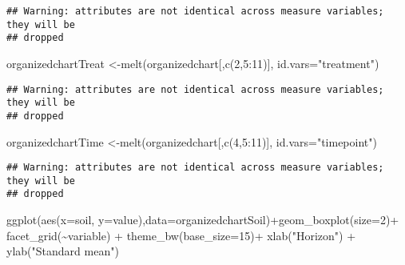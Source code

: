 \documentclass[
]{article}
\newenvironment{Shaded}{\begin{snugshade}}{\end{snugshade}}
\newcommand{\AttributeTok}[1]{\textcolor[rgb]{0.77,0.63,0.00}{#1}}
\newcommand{\DecValTok}[1]{\textcolor[rgb]{0.00,0.00,0.81}{#1}}
\newcommand{\FunctionTok}[1]{\textcolor[rgb]{0.00,0.00,0.00}{#1}}
\newcommand{\NormalTok}[1]{#1}
\newcommand{\OtherTok}[1]{\textcolor[rgb]{0.56,0.35,0.01}{#1}}
\newcommand{\SpecialCharTok}[1]{\textcolor[rgb]{0.00,0.00,0.00}{#1}}
\newcommand{\StringTok}[1]{\textcolor[rgb]{0.31,0.60,0.02}{#1}}
\begin{document}
\begin{verbatim}
## Warning: attributes are not identical across measure variables; they will be
## dropped
\end{verbatim}

\begin{Shaded}
\begin{Highlighting}[]
\NormalTok{organizedchartTreat }\OtherTok{\textless{}{-}}\FunctionTok{melt}\NormalTok{(organizedchart[,}\FunctionTok{c}\NormalTok{(}\DecValTok{2}\NormalTok{,}\DecValTok{5}\SpecialCharTok{:}\DecValTok{11}\NormalTok{)], }\AttributeTok{id.vars=}\StringTok{"treatment"}\NormalTok{)}
\end{Highlighting}
\end{Shaded}

\begin{verbatim}
## Warning: attributes are not identical across measure variables; they will be
## dropped
\end{verbatim}

\begin{Shaded}
\begin{Highlighting}[]
\NormalTok{organizedchartTime }\OtherTok{\textless{}{-}}\FunctionTok{melt}\NormalTok{(organizedchart[,}\FunctionTok{c}\NormalTok{(}\DecValTok{4}\NormalTok{,}\DecValTok{5}\SpecialCharTok{:}\DecValTok{11}\NormalTok{)], }\AttributeTok{id.vars=}\StringTok{"timepoint"}\NormalTok{)}
\end{Highlighting}
\end{Shaded}

\begin{verbatim}
## Warning: attributes are not identical across measure variables; they will be
## dropped
\end{verbatim}

\begin{Shaded}
\begin{Highlighting}[]
\FunctionTok{ggplot}\NormalTok{(}\FunctionTok{aes}\NormalTok{(}\AttributeTok{x=}\NormalTok{soil, }\AttributeTok{y=}\NormalTok{value),}\AttributeTok{data=}\NormalTok{organizedchartSoil)}\SpecialCharTok{+}\FunctionTok{geom\_boxplot}\NormalTok{(}\AttributeTok{size=}\DecValTok{2}\NormalTok{)}\SpecialCharTok{+}
  \FunctionTok{facet\_grid}\NormalTok{(}\SpecialCharTok{\textasciitilde{}}\NormalTok{variable) }\SpecialCharTok{+}
  \FunctionTok{theme\_bw}\NormalTok{(}\AttributeTok{base\_size=}\DecValTok{15}\NormalTok{)}\SpecialCharTok{+}
  \FunctionTok{xlab}\NormalTok{(}\StringTok{"Horizon"}\NormalTok{) }\SpecialCharTok{+}
  \FunctionTok{ylab}\NormalTok{(}\StringTok{"Standard mean"}\NormalTok{)}
\end{Highlighting}
\end{Shaded}
\end{document}
